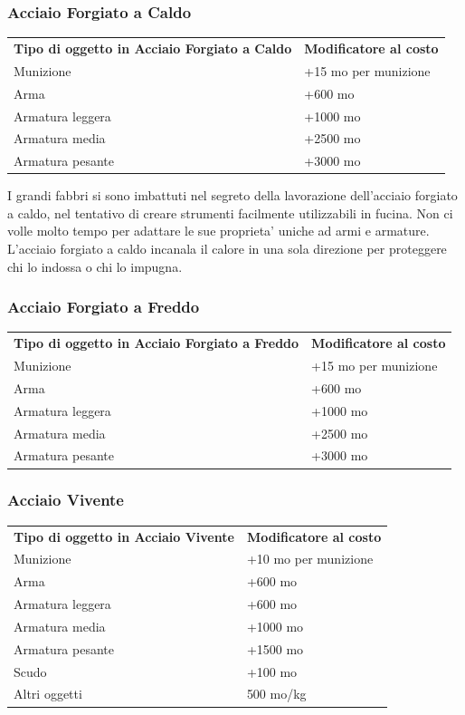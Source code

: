\documentclass[a4paper,11pt,twoside,openany]{book}
\begin{document}
{		\subsubsection{Acciaio Forgiato a Caldo}
		
		\label{acciaio-forgiato-a-caldo}
		
		\begin{tabular}{ll}
			\toprule
			\textbf{Tipo di oggetto in Acciaio Forgiato a Caldo} & \textbf{Modificatore al costo}\tabularnewline
			Munizione & +15 mo per munizione\tabularnewline
			Arma & +600 mo\tabularnewline
			Armatura leggera & +1000 mo\tabularnewline
			Armatura media & +2500 mo\tabularnewline
			Armatura pesante & +3000 mo\tabularnewline
		\end{tabular}
		
		I grandi fabbri si sono imbattuti nel segreto della lavorazione dell'acciaio
		forgiato a caldo, nel tentativo di creare strumenti facilmente utilizzabili
		in fucina. Non ci volle molto tempo per adattare le sue proprieta'
		uniche ad armi e armature. L'acciaio forgiato a caldo incanala il
		calore in una sola direzione per proteggere chi lo indossa o chi lo
		impugna.
		
		\subsubsection{Acciaio Forgiato a Freddo}
		
		\label{acciaio-forgiato-a-freddo}
		
		\begin{tabular}{ll}
			\toprule
			\textbf{Tipo di oggetto in Acciaio Forgiato a Freddo} & \textbf{Modificatore al costo}\tabularnewline
			Munizione & +15 mo per munizione\tabularnewline
			Arma & +600 mo\tabularnewline
			Armatura leggera & +1000 mo\tabularnewline
			Armatura media & +2500 mo\tabularnewline
			Armatura pesante & +3000 mo\tabularnewline
		\end{tabular}
		
		\subsubsection{Acciaio Vivente}
		
		\label{acciaio-vivente}
		
		\begin{tabular}{ll}
			\toprule 
			\textbf{Tipo di oggetto in Acciaio Vivente} & \textbf{Modificatore al costo}\tabularnewline
			Munizione & +10 mo per munizione\tabularnewline
			Arma & +600 mo\tabularnewline
			Armatura leggera & +600 mo\tabularnewline
			Armatura media & +1000 mo\tabularnewline
			Armatura pesante & +1500 mo\tabularnewline
			Scudo & +100 mo\tabularnewline
			Altri oggetti & 500 mo/kg\tabularnewline
		\end{tabular}
		
}
\end{document}
